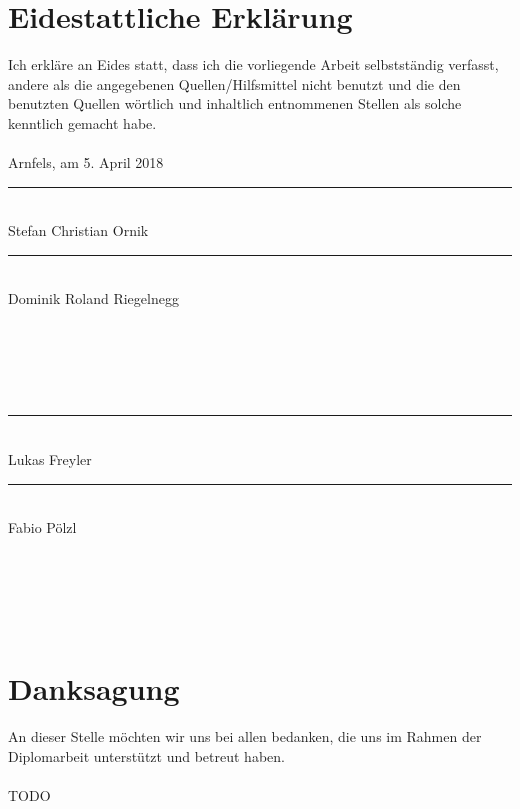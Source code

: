 \frontmatter												%
\addtocounter{page}{2}

\rehead{}
\ohead[\pagemark]{\pagemark}

\newcommand{\doublesignature}[2]{%
  \parbox{\textwidth}{
    \hfill
    \parbox{7cm}{
      \centering
      \rule{6cm}{1pt}\\
      #1
    }
    \parbox{7cm}{
      \centering
      \rule{6cm}{1pt}\\
      #2
    }
  }
  \mbox{}\\
  \mbox{}\\
  \mbox{}\\
  \mbox{}\\
}

\vspace*{20pt}

\section*{Eidestattliche Erklärung}
\label{sec:eidestattliche-erklaerung}
Ich erkläre an Eides statt, dass ich die vorliegende Arbeit selbstständig verfasst, andere als die angegebenen
Quellen/Hilfsmittel nicht benutzt und die den benutzten Quellen wörtlich und inhaltlich entnommenen
Stellen als solche kenntlich gemacht habe.\\
\\
Arnfels, am 5. April 2018\\

\vskip 1cm

\doublesignature{Stefan Christian Ornik}{Dominik Roland Riegelnegg}
\doublesignature{Lukas Freyler}{Fabio Pölzl}

\vskip 5cm

\clearpage

\newpage
\thispagestyle{empty}
\mbox{}

\clearpage

\section*{Danksagung}
\label{sec:danksagung}
An dieser Stelle möchten wir uns bei allen bedanken, die uns im Rahmen der Diplomarbeit unterstützt und betreut haben.\\
\\
TODO

\clearpage

\newpage
\thispagestyle{empty}
\mbox{}

\clearpage

